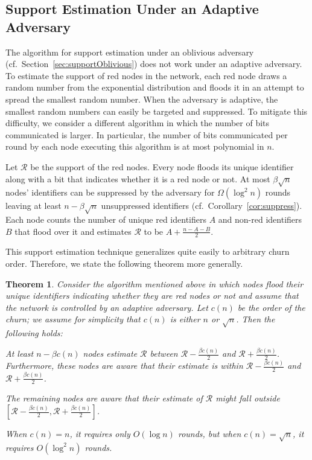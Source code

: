 \documentclass[leqno,11pt]{article}
\newtheorem{theorem}{Theorem}[section]
\newcommand{\R}{{\mathcal{R}}}
\begin{document}
{\subsection{Support Estimation Under an Adaptive Adversary} \label{sec:supportAdaptive}
The algorithm for support estimation under an oblivious adversary (cf.\ 
Section~\ref{sec:supportOblivious}) does not work under an adaptive 
adversary. To
estimate the support of red nodes in the network, each red node draws
a random number from the exponential distribution and floods it in an attempt to
spread the smallest random number. When the adversary is adaptive, the smallest
random numbers can easily be targeted and suppressed. To mitigate this difficulty, we consider a different algorithm in which the number of bits communicated is larger. In particular, the number of bits communicated per round by each node executing  this algorithm is at most polynomial in $n$. 


Let $\R$ be the
support of the red nodes. Every node floods its unique identifier along with a
bit that indicates whether it is a red node or not.  At most $\beta \sqrt{n}$
nodes' identifiers can be suppressed by the adversary for $\Omega(\log^2 n)$ rounds leaving  at least $n-\beta
\sqrt{n}$ unsuppressed identifiers (cf.\ Corollary~\ref{cor:suppress}). Each node
counts the number of unique red identifiers $A$ and non-red identifiers $B$ that
flood over it and estimates $\R$ to be $A + \frac{n-A-B}{2}$.  

This support
estimation technique generalizes quite easily to arbitrary churn order.
Therefore, we state the following theorem more generally.
\begin{theorem}\label{thm:AdaptiveSupport}
Consider the algorithm mentioned above in which nodes flood their unique
identifiers indicating whether they are red nodes or not and assume that the
network is controlled by an adaptive adversary.  Let $c(n)$ be the
order of the churn; we assume for simplicity that $c(n)$ is either $n$ or
$\sqrt{n}$.  Then the following holds:
\begin{compactenum}
	\item At least $n-\beta c(n)$  nodes estimate $\R$  between $\R - \frac{\beta c(n)}{2}$ and $\R+ \frac{\beta c(n)}{2}$. Furthermore, these nodes are aware that their estimate is within $\R - \frac{\beta c(n)}{2}$ and $\R+ \frac{\beta c(n)}{2}$.
	\item The remaining nodes are aware that their estimate of $\R$ might fall
    outside $[\R - \frac{\beta c(n)}{2}, \R+ \frac{\beta c(n)}{2}]$.
	\end{compactenum}
	When $c(n) = n$, it requires only $O(\log n)$ rounds, but when $c(n)=\sqrt{n}$, it requires $O(\log^2 n)$ rounds.
\end{theorem}

}
\end{document}
